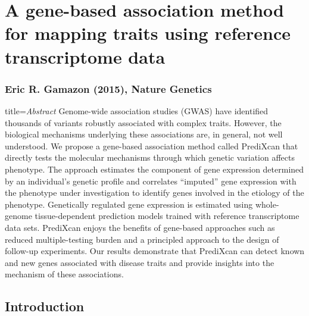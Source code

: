 \documentclass[../main.tex]{subfiles}
\begin{document}
\chapter[A gene-based association method for mapping traits]{A 
	gene-based association method for mapping traits using reference 
	transcriptome data}

\subsection{Eric R. Gamazon \etal (2015), Nature Genetics}

\begin{external_abstract}{title=\textit{Abstract}}
Genome-wide association studies (GWAS) have identified thousands of 
variants robustly associated with complex traits. However, the 
biological mechanisms underlying these associations are, in general, not 
well understood. We propose a gene-based association method called 
PrediXcan that directly tests the molecular mechanisms through which 
genetic variation affects phenotype. The approach estimates the 
component of gene expression determined by an individual's genetic 
profile and correlates \enquote{imputed} gene expression with the 
phenotype under investigation to identify genes involved in the etiology 
of the phenotype. Genetically regulated gene expression is estimated 
using whole-genome tissue-dependent prediction models trained with 
reference transcriptome data sets. PrediXcan enjoys the benefits of 
gene-based approaches such as reduced multiple-testing burden and a 
principled approach to the design of follow-up experiments. Our results 
demonstrate that PrediXcan can detect known and new genes associated 
with disease traits and provide insights into the mechanism of these 
associations.
\end{external_abstract}

\section{Introduction}
\end{document}
